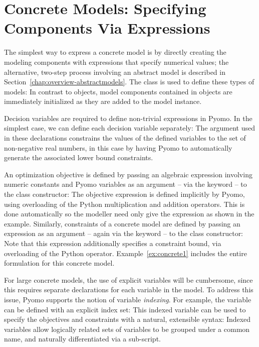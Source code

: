 \section{Concrete Models: Specifying Components Via Expressions}

The simplest way to express a concrete model is by directly creating
the modeling components with expressions that specify numerical values;
the alternative, two-step process involving an abstract model is described
in Section~\ref{chap:overview-abstractmodels}.
The  class is used to define these types of models:
In contrast to  objects, 
model components contained in\linebreak {} objects
are immediately initialized as they are added to
the model instance.

Decision variables are required to define non-trivial expressions in Pyomo. In the
simplest case, we can define each decision variable separately:
The  argument used in these declarations constrains the values of
the defined variables to the set of non-negative real numbers, in this case by
having Pyomo to automatically generate the associated lower bound constraints.

An optimization objective is defined by passing an algebraic expression involving
numeric constants and Pyomo variables as an argument -- via the  keyword --
to the  class constructor:
The objective expression is defined implicitly by Pyomo, using overloading of the Python
multiplication and addition operators. This is done automatically so the modeller need only
give the expression as shown in the example.  Similarly, constraints of a concrete model are
defined by passing an expression as an argument -- again via the  keyword -- 
to the  class constructor:
Note that this expression additionally specifies a constraint bound, via overloading
of the Python \code{>=} operator.
Example~\ref{ex:concrete1} includes the entire formulation for this concrete model.

For large concrete models, the use of explicit variables will be cumbersome, since this requires separate 
declarations for each variable in the model.  To address this issue, Pyomo supports the notion of variable 
\emph{indexing}. For example, the variable  can be defined with an explicit index set:
This indexed variable can be used to specify the objectives and constraints with a natural, extensible syntax:
Indexed variables allow logically related sets of variables to be grouped under a common name, and naturally
differentiated via a sub-script.


